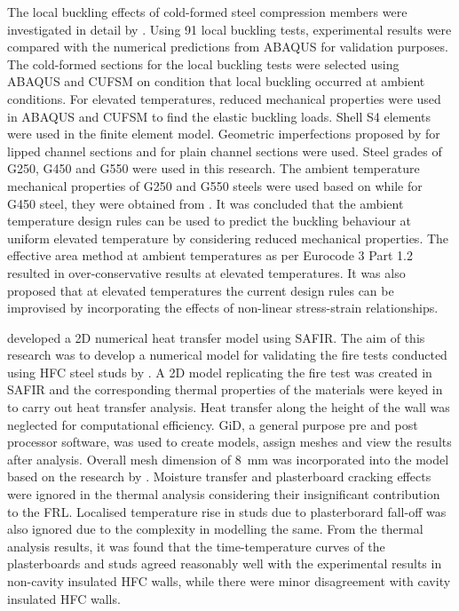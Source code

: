 The local buckling effects of cold-formed steel compression members were investigated in detail by \citet{Gunalan2015}. Using 91 local buckling tests, experimental results were compared with the numerical predictions from ABAQUS for validation purposes. The cold-formed sections for the local buckling tests were selected using ABAQUS and CUFSM on condition that local buckling occurred at ambient conditions. For elevated temperatures, reduced mechanical properties were used in ABAQUS and CUFSM to find the elastic buckling loads. Shell S4 elements were used in the finite element model. Geometric imperfections proposed by \citet{Schafer2010} for lipped channel sections and \citet{Camotim2006} for plain channel sections were used. Steel grades of G250, G450 and G550 were used in this research. The ambient temperature mechanical properties of G250 and G550 steels were used based on \citet{Ranawaka2009a} while for G450 steel, they were obtained from \citet{Kankanamge2011}. It was concluded that the ambient temperature design rules can be used to predict the buckling behaviour at uniform elevated temperature by considering reduced mechanical properties. The effective area method at ambient temperatures as per Eurocode 3 Part 1.2 resulted in over-conservative results at elevated temperatures. It was also proposed that at elevated temperatures the current design rules can be improvised by incorporating the effects of non-linear stress-strain relationships.

\citet{Kesawan2015a} developed a 2D numerical heat transfer model using SAFIR. The aim of this research was to develop a numerical model for validating the fire tests conducted using HFC steel studs by \citet{Kesawan2015}. A 2D model replicating the fire test was created in SAFIR and the corresponding thermal properties of the materials were keyed in to carry out heat transfer analysis. Heat transfer along the height of the wall was neglected for computational efficiency. GiD, a general purpose pre and post processor software, was used to create models, assign meshes and view the results after analysis. Overall mesh dimension of 8~mm was incorporated into the model based on the research by \citet{Keerthan2012}. Moisture transfer and plasterboard cracking effects were ignored in the thermal analysis considering their insignificant contribution to the FRL. Localised temperature rise in studs due to plasterborard fall-off was also ignored due to the complexity in modelling the same. From the thermal analysis results, it was found that the time-temperature curves of the plasterboards and studs agreed reasonably well with the experimental results in non-cavity insulated HFC walls, while there were minor disagreement with cavity insulated HFC walls. 

